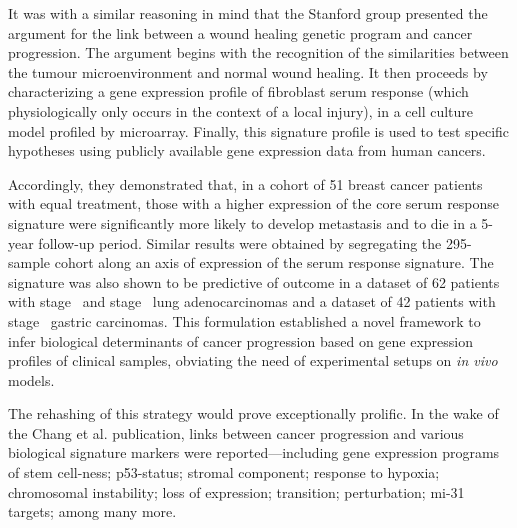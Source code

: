 
It was with a similar reasoning in mind that the Stanford group presented the
argument for the link between a wound healing genetic program and cancer
progression.\cite{chang_gene_2004} The argument begins with the recognition of
the similarities between the tumour microenvironment and normal wound healing.
It then proceeds by characterizing a gene expression profile of fibroblast serum
response (which physiologically only occurs in the context of a local injury),
in a cell culture model profiled by microarray.  Finally, this signature profile
is used to test specific hypotheses using publicly available gene expression
data from human cancers.

Accordingly, they demonstrated that, in a cohort of 51
breast cancer patients with equal treatment, those with a higher expression of
the core serum response signature were significantly more likely to develop
metastasis and to die in a \mbox{5-year} \mbox{follow-up} period.  Similar
results were obtained by segregating the \mbox{295-sample} 
cohort along an axis of expression of the serum response signature.  The
signature was also shown to be predictive of outcome in a dataset of 62 patients
with \mbox{stage } and \mbox{stage } lung
adenocarcinomas\cite{garber_diversity_2001} and a dataset of 42 patients with
\mbox{stage } gastric carcinomas.\cite{leung_phospholipase_2002}
This formulation established a novel framework to infer biological determinants
of cancer progression based on gene expression profiles of clinical samples,
obviating the need of experimental setups on \emph{in vivo} models.

The rehashing of this strategy would prove exceptionally prolific.  In the wake
of the Chang et al. publication, links between cancer progression and various
biological signature markers were reported---including gene expression programs
of stem
\mbox{cell-ness};\cite{glinsky_microarray_2005,ben-porath_embryonic_2008}
p53-status;\cite{miller_expression_2005} stromal
component;\cite{west_determination_2005} response to
hypoxia;\cite{chi_gene_2006} chromosomal
instability;\cite{carter_signature_2006,buffa_large_2010} loss of
\emph{} expression;\cite{saal_poor_2007} 
transition;\cite{welm_macrophage-stimulating_2007,taube_core_2010}
\emph{} perturbation;\cite{hallstrom_e2f1-dependent_2008}
mi-31 targets;\cite{valastyan_tumor_2011} among many more.

